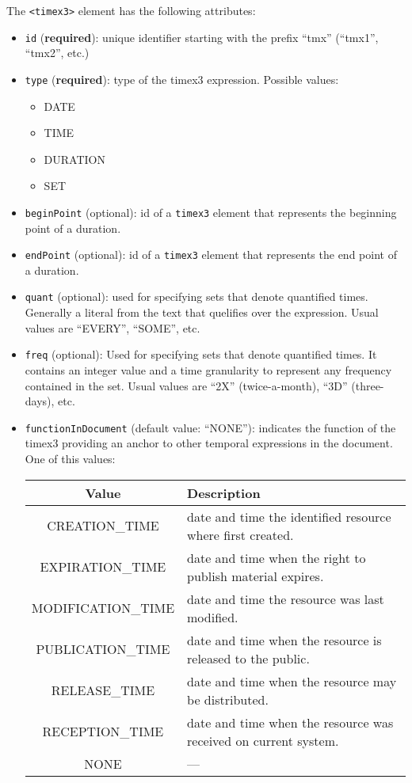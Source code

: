 The \texttt{<timex3>} element has the following attributes:
\begin{itemize}
\item \texttt{id} (\textbf{required}): unique identifier starting with
  the prefix ``tmx'' (``tmx1'', ``tmx2'', etc.)

\item \texttt{type} (\textbf{required}): type of the timex3
  expression. Possible values:
  \begin{itemize}
  \item DATE
  \item TIME
  \item DURATION
  \item SET
  \end{itemize}

\item \texttt{beginPoint} (optional): id of a \texttt{timex3} element that
  represents the beginning point of a duration.
\item \texttt{endPoint} (optional): id of a \texttt{timex3} element that
  represents the end point of a duration.
\item \texttt{quant} (optional): used for specifying sets that denote
  quantified times. Generally a literal from the text that quelifies over
  the expression. Usual values are ``EVERY'', ``SOME'', etc.
\item \texttt{freq} (optional): Used for specifying sets that denote
  quantified times. It contains an integer value and a time granularity to
  represent any frequency contained in the set. Usual values are ``2X''
  (twice-a-month), ``3D'' (three-days), etc.

\item \texttt{functionInDocument} (default value: ``NONE''): indicates the
  function of the timex3 providing an anchor to other temporal expressions
  in the document. One of this values:

  \begin{tabular}{|c|p{9cm}|}
    \hline
    Value & Description \\
    \hline
    CREATION\_TIME     & date and time the identified resource where first created.\\
    EXPIRATION\_TIME   & date and time when the right to publish material expires.\\
    MODIFICATION\_TIME & date and time the resource was last modified.\\
    PUBLICATION\_TIME  & date and time when the resource is released to the public.\\
    RELEASE\_TIME      & date and time when the resource may be distributed.\\
    RECEPTION\_TIME    & date and time when the resource was received on current system.\\
    NONE & ---\\
    \hline


\end{tabular}
\end{itemize}
